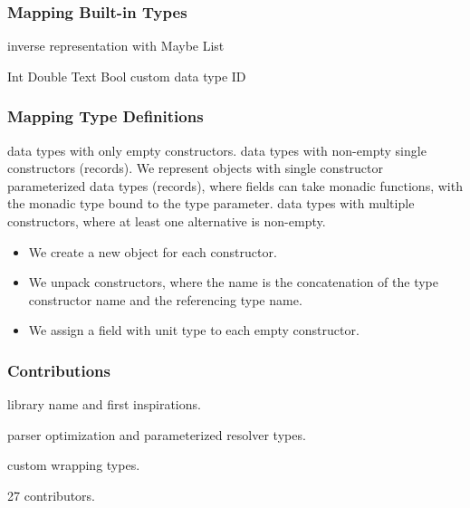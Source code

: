 \begin{frame}\frametitle{Mapping Built-in Types}
\begin{itemize}
  \begin{itemize}
     inverse representation with Maybe
     List
  \end{itemize}
  \begin{itemize}
     Int
     Double
     Text
     Bool
     custom data type ID 
  \end{itemize}
\end{itemize}
\end{frame}

\begin{frame}\frametitle{Mapping Type Definitions}

\begin{itemize}
   data types with only empty constructors.
   data types with non-empty single constructors (records). 
   We represent objects with single constructor parameterized data types (records), where fields can take monadic functions, with the monadic type bound to the type parameter. 
   data types with multiple constructors, where at least one alternative is non-empty.
  \begin{itemize}
    \item We create a new object for each constructor.
    \item We unpack constructors, where the name is the concatenation of the type constructor name and the referencing type name. 
    \item We assign a field with unit type to each empty constructor.
  \end{itemize}
\end{itemize}

\end{frame}

\begin{frame}\frametitle{Contributions}

\begin{itemize} 
  
     library name and first inspirations.

     parser optimization and parameterized resolver types.
    
     custom wrapping types.

      27 contributors.

\end{itemize}

\end{frame}